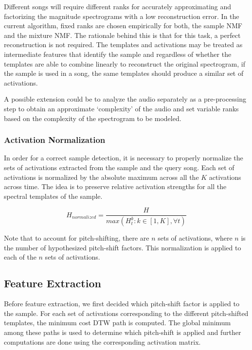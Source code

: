 \documentclass{article}
\begin{document}
Different songs will require different ranks for accurately approximating and factorizing the magnitude spectrograms with a low reconstruction error. In the current algorithm, fixed ranks are chosen empirically for both, the sample NMF and the mixture NMF. The rationale behind this is that for this task, a perfect reconstruction is not required. The templates and activations may be treated as intermediate features that identify the sample and regardless of whether the templates are able to combine linearly to reconstruct the original spectrogram, if the sample is used in a song, the same templates should produce a similar set of activations. 

A possible extension could be to analyze the audio separately as a pre-processing step to obtain an approximate `complexity' of the audio and set variable ranks based on the complexity of the spectrogram to be modeled. 

\subsubsection{Activation Normalization}

In order for a correct sample detection, it is necessary to properly normalize the sets of activations extracted from the sample and the query song. Each set of activations is normalized by the absolute maximum across all the $K$ activations across time. The idea is to preserve relative activation strengths for all the spectral templates of the sample.

\[H_{normalized} = \frac{H}{max(H^{k}_{t}: k\in[1,K], \forall t )}\]

Note that to account for pitch-shifting, there are $n$ sets of activations, where $n$ is the number of hypothesized pitch-shift factors. This normalization is applied to each of the $n$ sets of activations. 


\subsection{Feature Extraction}

Before feature extraction, we first decided which pitch-shift factor is applied to the sample. For each set of activations corresponding to the different pitch-shifted templates, the minimum cost DTW path is computed. The global minimum among these paths is used to determine which pitch-shift is applied and further computations are done using the corresponding activation matrix.
\end{document}
